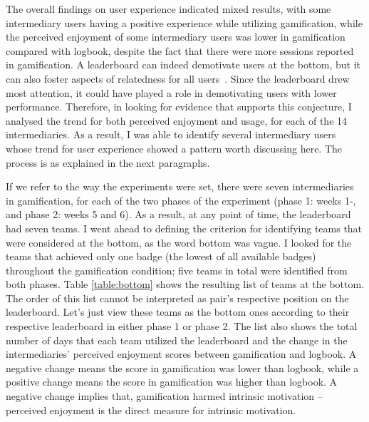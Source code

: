 The overall findings on user experience indicated mixed results, with some intermediary users having a positive experience while utilizing gamification, while the perceived enjoyment of some intermediary users was lower in gamification compared with logbook, despite the fact that there were more sessions reported in gamification. A leaderboard can indeed demotivate users at the bottom, but it can also foster aspects of relatedness for all users~\citep{sailer2013:psychological}. Since the leaderboard drew most attention, it could have played a role in demotivating users with lower performance. Therefore, in looking for evidence that supports this conjecture, I analysed the trend for both perceived enjoyment and usage, for each of the 14 intermediaries. As a result, I was able to identify several intermediary users whose trend for user experience showed a pattern worth discussing here. The process is as explained in the next paragraphs.

If we refer to the way the experiments were set, there were seven intermediaries in gamification, for each of the two phases of the experiment (phase 1: weeks 1\thinspace-, and phase 2: weeks 5 and 6). As a result, at any point of time, the leaderboard had seven teams. I went ahead to defining the criterion for identifying teams that were considered at the bottom, as the word bottom was vague. I looked for the teams that achieved only one badge (the lowest of all available badges) throughout the gamification condition; five teams in total were identified from both phases. Table \ref{table:bottom} shows the resulting list of teams at the bottom. The order of this list cannot be interpreted as pair's respective position on the leaderboard. Let's just view these teams as the bottom ones according to their respective leaderboard in either phase 1 or phase 2. The list also shows the total number of days that each team utilized the leaderboard and the change in the intermediaries' perceived enjoyment scores between gamification and logbook. A negative change means the score in gamification was lower than logbook, while a positive change means the score in gamification was higher than logbook. A negative change implies that, gamification harmed intrinsic motivation -- perceived enjoyment is the direct measure for intrinsic motivation. 

